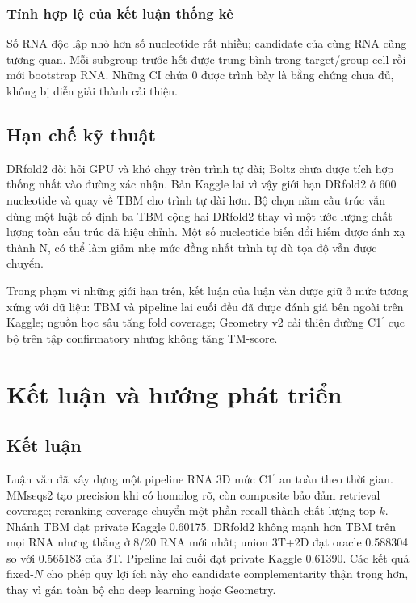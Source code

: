\documentclass[12pt,a4paper,oneside]{report}
\newcommand{\cprime}{C1$^{\prime}$}
\begin{document}
\subsection{Tính hợp lệ của kết luận thống kê}

Số RNA độc lập nhỏ hơn số nucleotide rất nhiều; candidate của cùng RNA cũng tương quan.
Mỗi subgroup trước hết được trung bình trong target/group cell rồi mới bootstrap RNA.
Những CI chứa 0 được trình bày là bằng chứng chưa đủ, không bị diễn giải thành cải thiện.

\section{Hạn chế kỹ thuật}

DRfold2 đòi hỏi GPU và khó chạy trên trình tự dài; Boltz chưa được tích hợp thống nhất
vào đường xác nhận. Bản Kaggle lai vì vậy giới hạn DRfold2 ở 600 nucleotide và quay về
TBM cho trình tự dài hơn. Bộ chọn năm cấu trúc vẫn dùng một luật cố định ba TBM cộng hai
DRfold2 thay vì một ước lượng chất lượng toàn cấu trúc đã hiệu chỉnh.
Một số nucleotide biến đổi hiếm được ánh xạ thành N, có thể làm giảm nhẹ mức đồng nhất
trình tự dù tọa độ vẫn được chuyển.

Trong phạm vi những giới hạn trên, kết luận của luận văn được giữ ở mức tương xứng với
dữ liệu: TBM và pipeline lai cuối đều đã được đánh giá bên ngoài trên Kaggle; nguồn học
sâu tăng fold coverage; Geometry v2 cải thiện đường \cprime{} cục bộ trên tập
confirmatory nhưng không tăng TM-score.

\chapter{Kết luận và hướng phát triển}

\section{Kết luận}

Luận văn đã xây dựng một pipeline RNA 3D mức \cprime{} an toàn theo thời gian. MMseqs2
tạo precision khi có homolog rõ, còn composite bảo đảm retrieval coverage; reranking
coverage chuyển một phần recall thành chất lượng top-$k$. Nhánh TBM đạt private Kaggle
0.60175. DRfold2 không mạnh hơn TBM trên mọi RNA nhưng thắng ở 8/20 RNA mới nhất; union
3T+2D đạt oracle 0.588304 so với 0.565183 của 3T. Pipeline lai cuối đạt private Kaggle
0.61390. Các kết quả fixed-$N$ cho phép quy lợi ích này cho candidate complementarity
thận trọng hơn, thay vì gán toàn bộ cho deep learning hoặc Geometry.
\end{document}
